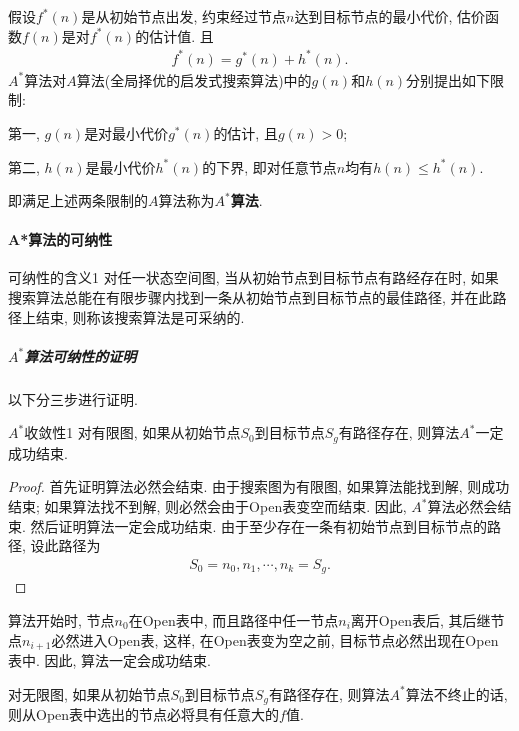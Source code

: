 假设$f^*(n)$是从初始节点出发, 约束经过节点$n$达到目标节点的最小代价, 估价函数$f(n)$是对$f^*(n)$的估计值. 且
\begin{align}
  f^*(n)=g^*(n)+h^*(n).
\end{align}
$A^*$算法对$A$算法(全局择优的启发式搜索算法)中的$g(n)$和$h(n)$分别提出如下限制:

第一, $g(n)$是对最小代价$g^*(n)$的估计, 且$g(n)>0$;

第二, $h(n)$是最小代价$h^*(n)$的下界, 即对任意节点$n$均有$h(n)\leq h^*(n)$.

即满足上述两条限制的$A$算法称为\textbf{$A^*$算法}.
\paragraph{A*算法的可纳性}
\begin{mydef}{可纳性的含义}{1}
对任一状态空间图, 当从初始节点到目标节点有路经存在时, 如果搜索算法总能在有限步骤内找到一条从初始节点到目标节点的最佳路径, 并在此路径上结束, 则称该搜索算法是可采纳的.
\end{mydef}
\subparagraph{$A^*$算法可纳性的证明}
以下分三步进行证明.
\begin{mythm}{$A^*$收敛性}{1}
对有限图, 如果从初始节点$S_0$到目标节点$S_g$有路径存在, 则算法$A^*$一定成功结束.
\end{mythm}
\begin{proof}
首先证明算法必然会结束. 由于搜索图为有限图, 如果算法能找到解, 则成功结束; 如果算法找不到解, 则必然会由于Open表变空而结束. 因此, $A^*$算法必然会结束.
然后证明算法一定会成功结束. 由于至少存在一条有初始节点到目标节点的路径, 设此路径为
\begin{align}
  S_0=n_0, n_1, \cdots, n_k=S_g.
\end{align}
\end{proof}
算法开始时, 节点$n_0$在Open表中, 而且路径中任一节点$n_i$离开Open表后, 其后继节点$n_{i+1}$必然进入Open表, 这样, 在Open表变为空之前, 目标节点必然出现在Open表中. 因此, 算法一定会成功结束.
\begin{mylem}{}{}\label{AIlem001}
对无限图, 如果从初始节点$S_0$到目标节点$S_g$有路径存在, 则算法$A^*$算法不终止的话, 则从Open表中选出的节点必将具有任意大的$f$值.
\end{mylem}
